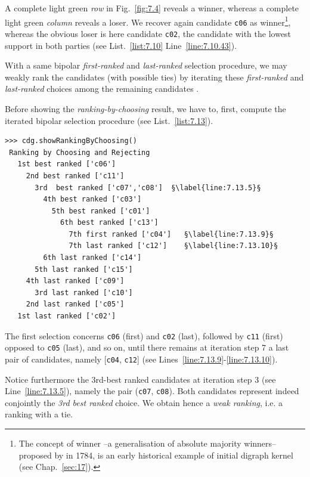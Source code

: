 A complete light green \emph{row} in Fig.~\vref{fig:7.4} reveals a \Condorcet winner, whereas a complete light green \emph{column} reveals a \Condorcet loser. We recover again candidate \texttt{c06} as \Condorcet winner\footnote{The concept of \Condorcet winner --a generalisation of absolute majority winners-- proposed by \Condorcet in 1784, is an early historical example of initial digraph kernel (see Chap.~\ref{sec:17}).}, whereas the obvious \Condorcet loser is here candidate \texttt{c02}, the candidate with the lowest support in both parties (see List.~\vref{list:7.10} Line~\ref{line:7.10.43}).

With a same bipolar \emph{first-ranked} and \emph{last-ranked} selection procedure, we may weakly rank the candidates (with possible ties) by iterating these \emph{first-ranked} and \emph{last-ranked} choices among the remaining candidates \citep{BIS-1999}.

Before showing the \emph{ranking-by-choosing} result, we have to, first, compute the iterated bipolar selection procedure (see List.~\vref{list:7.13}).
\begin{lstlisting}[caption={Ranking by iterating choosing the \emph{first} and \emph{last} remaining candidates },label=list:7.13]
>>> cdg.showRankingByChoosing()
 Ranking by Choosing and Rejecting
   1st best ranked ['c06']
     2nd best ranked ['c11']
       3rd  best ranked ['c07','c08']  §\label{line:7.13.5}§
         4th best ranked ['c03']
           5th best ranked ['c01']
             6th best ranked ['c13']
               7th first ranked ['c04']   §\label{line:7.13.9}§ 
               7th last ranked ['c12']    §\label{line:7.13.10}§ 
	     6th last ranked ['c14']
	   5th last ranked ['c15']
	 4th last ranked ['c09']
       3rd last ranked ['c10']
     2nd last ranked ['c05']
   1st last ranked ['c02']
\end{lstlisting}

The first selection concerns \texttt{c06} (first) and \texttt{c02} (last), followed by \texttt{c11} (first) opposed to \texttt{c05} (last), and so on, until there remains at iteration step 7 a last pair of candidates, namely [\texttt{c04}, \texttt{c12}] (see Lines~\ref{line:7.13.9}-\ref{line:7.13.10}).

Notice furthermore the 3rd-best ranked candidates at iteration step 3 (see Line~\ref{line:7.13.5}), namely the pair (\texttt{c07}, \texttt{c08}). Both candidates represent indeed conjointly the \emph{3rd best ranked} choice. We obtain hence a \emph{weak ranking}, i.e. a ranking with a tie.

